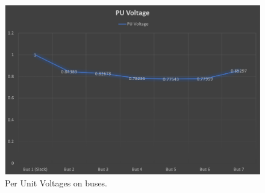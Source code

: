 \documentclass[12pt]{article}
\begin{document}
		\begin{figure}[H]
			\centerline{\includegraphics[scale=0.3]{images/perunit}}
			\caption{Per Unit Voltages on buses.}
		\end{figure}
		

    
\end{document}
